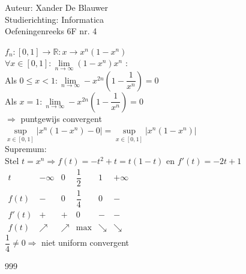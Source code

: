 \documentclass[a4paper]{article}
\begin{document}
\noindent \large Auteur: Xander De Blauwer \\
\noindent \large Studierichting: Informatica\\
\noindent \large Oefeningenreeks 6F nr. 4\\

\medskip

\normalsize

$f_n : [0,1] \to \mathbb{R}: x \to x^n(1-x^n)$ \\

$ \forall x \in [0,1]: \lim\limits_{n \to \infty} (1-x^n)x^n $ :\\

Als $ 0 \leq x < 1: \lim\limits_{n \to \infty} -x^{2n}\left(1-\dfrac{1}{x^n}\right) = 0 $ \\

Als $x = 1: \lim\limits_{n \to \infty} -x^{2n}\left(1 - \dfrac{1}{x^n}\right) = 0 $ \\

$ \Rightarrow$ puntgewijs convergent \\

$\sup\limits_{x \in [0,1]}\left|x^n(1-x^n) - 0\right| = \sup\limits_{x \in [0,1]}\left|x^n(1-x^n)\right|$ \\

Supremum: \\

Stel $t = x^n \Rightarrow f(t) = -t^2 + t = t(1-t) $ en $f'(t) = -2t + 1 $ \\


$\begin{array}{c|cccccc}
t      & -\infty & 0 & \dfrac{1}{2} & 1 & +\infty \\ \hline
f(t)   & -       & 0 & \dfrac{1}{4} & 0 & -       \\
f'(t)  & +       & + &  0 & - & -       \\ \hline
f(t)
       & \nearrow & \nearrow & \max & \searrow & \searrow
\end{array}$ \\


$\dfrac{1}{4}\neq 0 \Rightarrow $ niet uniform convergent \\



\begin{thebibliography}{999}
\end{thebibliography}
\end{document}
